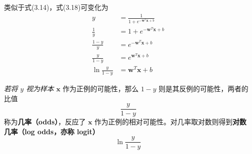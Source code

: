 \documentclass[../studies-ml.tex]{subfiles}
\begin{document}
类似于式(3.14)，式(3.18)可变化为
\begin{equation}
  \begin{split}
    y & = \frac{1}{1 + e^{-\pmb{w}^T\pmb{x}+b}} \\
    \frac{1}{y} & = 1 + e^{-\pmb{w}^T\pmb{x}+b} \\
    \frac{1-y}{y} & = e^{-\pmb{w}^T\pmb{x}+b} \\
    \frac{y}{1-y} & = e^{\pmb{w}^T\pmb{x}+b} \\
    \ln\frac{y}{1-y} & = \pmb{w}^T\pmb{x}+b
  \end{split}
\end{equation}

\textit{若将 $y$ 视为样本 $\pmb{x}$} 作为正例的可能性，那么 $1-y$ 则是其反例的可能性，两者的比值
\begin{equation}
  \frac{y}{1-y}
\end{equation}
称为\textbf{几率（odds）}，反应了 $\pmb{x}$ 作为正例的相对可能性。对几率取对数则得到\textbf{对数几率（log odds，亦称 logit）}
\begin{equation}
  \ln\frac{y}{1-y}
\end{equation}

\end{document}

